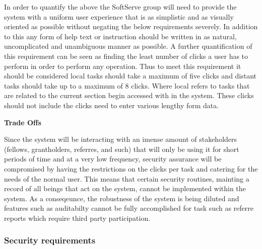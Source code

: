 \begin{flushleft}
In order to quantify the above the SoftServe group will need to provide the system with a uniform user experience that is as simplistic and as visually oriented as possible without negating the below requirements severely. In addition to this any form of help text or instruction should be written in as natural, uncomplicated and unambiguous manner as possible. A further quantification of this requirement can be seen as finding the least number of clicks a user has to perform in order to perform any operation. Thus to meet this requirement it should be considered local tasks should take a maximum of five clicks and distant tasks should take up to a maximum of 8 clicks. Where local refers to tasks that are related to the current section begin accessed with in the system. These clicks should not include the clicks need to enter various lengthy form data.
\vspace{0.1in}

\textbf{Trade Offs}

Since the system will be interacting with an imense amount of stakeholders (fellows, grantholders, referres, and such) that will only be using it for short periods of time and at a very low frequency, security assurance will be compromised by having the restrictions on the clicks per task and catering for the needs of the normal user. This means that certain security routines, mainting a record of all beings that act on the system, cannot be implemented within the system. As a conseqeunce, the robustness of the system is being diluted and features such as auditabilty cannot be fully accomplished for task such as referre reports which require third party participation.
\end{flushleft}

\subsubsection{Security requirements}

